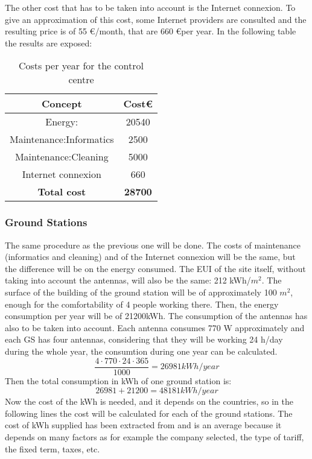 The other cost that has to be taken into account is the Internet connexion. To give an approximation of this cost, some Internet providers are consulted and the resulting price is of 55 \euro /month, that are 660 \euro per year.
In the following table the results are exposed:
\begin{table}[H]
\begin{center}
\begin{tabular}{|c|c|}
\hline
\textbf{Concept}&\textbf{Cost\euro}\\
\hline
Energy:&20540\\
\hline
Maintenance:Informatics&2500\\
\hline
Maintenance:Cleaning&5000\\
\hline
Internet connexion&660\\
\hline
\textbf{Total cost}&\textbf{28700}\\
\hline
\end{tabular}
\caption{Costs per year for the control centre}
\end{center}
\end{table}
\subsubsection{Ground Stations}
The same procedure as the previous one will be done. The costs of maintenance (informatics and cleaning) and of the Internet connexion will be the same, but the difference will be on the energy consumed. The EUI of the site itself, without taking into account the antennas, will also be the same: 212 kWh/$m^2$. The surface of the building of the ground station will be of approximately 100 $m^2$, enough for the comfortability of 4 people working there. Then, the energy consumption per year will be of 21200kWh. The consumption of the antennas has also to be taken into account. Each antenna consumes 770 W approximately and each GS has four antennas, considering that they will be working 24 h/day during the whole year, the consumtion during one year can be calculated.
\begin{equation}
\frac{4 \cdot 770 \cdot 24 \cdot 365}{1000}=26981 kWh/year 
\end{equation}
Then the total consumption in kWh of one ground station is:
\begin{equation}
26981+21200=48181 kWh/year
\end{equation}
Now the cost of the kWh is needed, and it depends on the countries, so in the following lines the cost will be calculated for each of the ground stations. The cost of kWh supplied has been extracted from \cite{OVO} and is an average because it depends on many factors as for example the company selected, the type of tariff, the fixed term, taxes, etc. 
